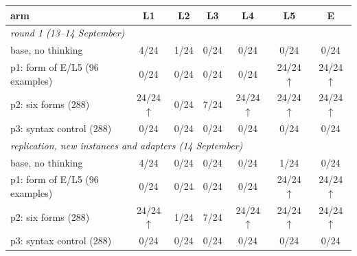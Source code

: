 \begin{tabular}{lcccccc}
\toprule
arm & L1 & L2 & L3 & L4 & L5 & E \\
\midrule
\multicolumn{7}{l}{\emph{round 1 (13--14 September)}} \\
base, no thinking & 4/24 & 1/24 & 0/24 & 0/24 & 0/24 & 0/24 \\
p1: form of E/L5 (96 examples) & 0/24 & 0/24 & 0/24 & 0/24 & 24/24$\uparrow$ & 24/24$\uparrow$ \\
p2: six forms (288) & 24/24$\uparrow$ & 0/24 & 7/24 & 24/24$\uparrow$ & 24/24$\uparrow$ & 24/24$\uparrow$ \\
p3: syntax control (288) & 0/24 & 0/24 & 0/24 & 0/24 & 0/24 & 0/24 \\
\midrule
\multicolumn{7}{l}{\emph{replication, new instances and adapters (14 September)}} \\
base, no thinking & 4/24 & 0/24 & 0/24 & 0/24 & 1/24 & 0/24 \\
p1: form of E/L5 (96 examples) & 0/24 & 0/24 & 0/24 & 0/24 & 24/24$\uparrow$ & 24/24$\uparrow$ \\
p2: six forms (288) & 24/24$\uparrow$ & 1/24 & 7/24 & 24/24$\uparrow$ & 24/24$\uparrow$ & 24/24$\uparrow$ \\
p3: syntax control (288) & 0/24 & 0/24 & 0/24 & 0/24 & 0/24 & 0/24 \\
\bottomrule
\end{tabular}
